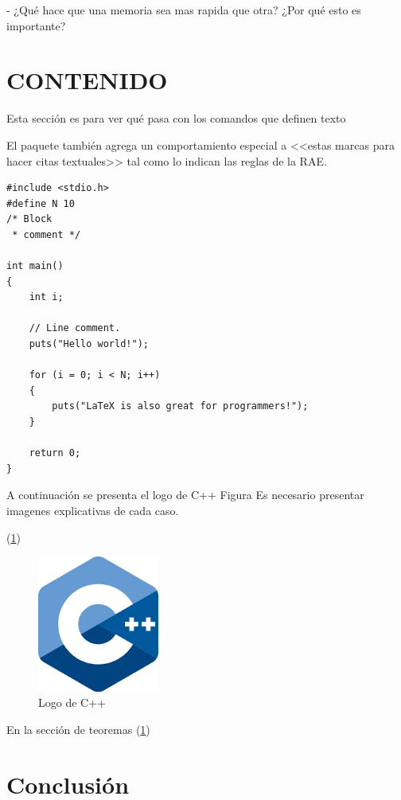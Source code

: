 \documentclass{article}
\begin{document}
- ¿Qué hace que una memoria sea mas rapida que otra? ¿Por qué esto es importante?

\section{CONTENIDO} \label{contenido}

Esta sección es para ver qué pasa con los comandos 
que definen texto

El paquete también agrega un comportamiento especial 
a <<estas marcas para hacer citas textuales>> tal como 
lo indican las reglas de la RAE. \cite{dirac}

\begin{lstlisting}
#include <stdio.h>
#define N 10
/* Block
 * comment */

int main()
{
    int i;

    // Line comment.
    puts("Hello world!");
    
    for (i = 0; i < N; i++)
    {
        puts("LaTeX is also great for programmers!");
    }

    return 0;
}
\end{lstlisting}

A continuación se presenta el logo de C++ Figura
Es necesario presentar imagenes explicativas de cada caso.

(\ref{fig:cpplogo})

\begin{figure}[h]
\includegraphics[width=4cm]{cpplogo.png}
\centering
\caption{Logo de C++}
\label{fig:cpplogo}
\end{figure}

En la sección de teoremas (\ref{contenido})

\section{Conclusión} \label{conclulsion}



\end{document}
